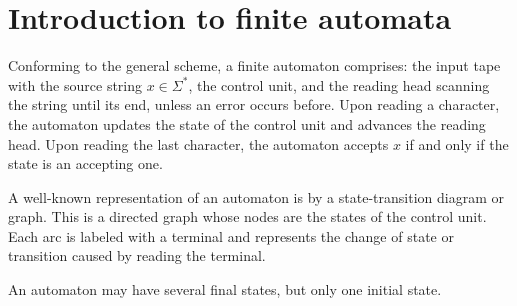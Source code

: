 \section{Introduction to finite automata}

Conforming to the general scheme, a finite automaton comprises: the input tape with the source string $x \in \Sigma^{*}$, the control unit, and the reading head scanning 
the string until its end, unless an error occurs before. Upon reading a character, the automaton updates the state  of the  control unit and advances the reading head. 
Upon reading the last character, the automaton accepts $x$ if and only if the state is an accepting one.

A well-known representation of an automaton is by a state-transition diagram or graph. This is a directed graph whose nodes are the states of the control unit. Each arc
is labeled with a terminal and represents the change of state or transition caused by reading the terminal.

An automaton may have several final states, but only one initial state. 